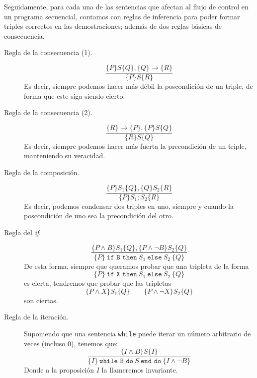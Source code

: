 Seguidamente, para cada una de las sentencias que afectan al flujo de control en un programa secuencial, contamos con reglas de inferencia para poder formar triples correctos en las demostraciones; además de dos reglas básicas de consecuencia.

\begin{description}
    \item [Regla de la consecuencia (1).] 
        \begin{equation*}
            \dfrac{\{P\}S\{Q\}, \{Q\}\rightarrow\{R\}}{\{P\}S\{R\}}
        \end{equation*}
        Es decir, siempre podemos hacer más débil la poscondición de un triple, de forma que este siga siendo cierto.
    \item [Regla de la consecuencia (2).] 
        \begin{equation*}
            \dfrac{\{R\}\rightarrow\{P\},\{P\}S\{Q\}}{\{R\}S\{Q\}}
        \end{equation*}
        Es decir, siempre podemos hacer más fuerta la precondición de un triple, manteniendo su veracidad.
    \item [Regla de la composición.] 
        \begin{equation*}
            \dfrac{\{P\}S_1\{Q\}, \{Q\}S_2\{R\}}{\{P\}S_1;S_2\{R\}}
        \end{equation*}
        Es decir, podemos condensar dos triples en uno, siempre y cuando la poscondición de uno sea la precondición del otro.
    \item [Regla del \textit{if}.] 
        \begin{equation*}
            \dfrac{\{P\land B\}S_1\{Q\}, \{P\land \lnot B\}S_2\{Q\}}{\{P\}\ \texttt{if B then}\ S_1\ \texttt{else}\ S_2\ \{Q\}}
        \end{equation*}
        De esta forma, siempre que queramos probar que una tripleta de la forma
        \begin{equation*}
            \{P\}\ \texttt{if X then}\ S_1\ \texttt{else}\ S_2\ \{Q\}
        \end{equation*}
        es cierta, tendremos que probar que las tripletas
        \begin{equation*}
            \{P\land X\}S_1\{Q\}\qquad \{P\land \lnot X\}S_2\{Q\}
        \end{equation*}
        son ciertas.
    \item [Regla de la iteración.] 
        Suponiendo que una sentencia \verb|while| puede iterar un número arbitrario de veces (incluso 0), tenemos que:
        \begin{equation*}
            \dfrac{\{I\land B\}S\{I\}}{\{I\}\ \texttt{while B do}\ S\ \texttt{end do}\ \{I\land \lnot B\}}
        \end{equation*}
        Donde a la proposición $I$ la llameremos invariante.
\end{description}

